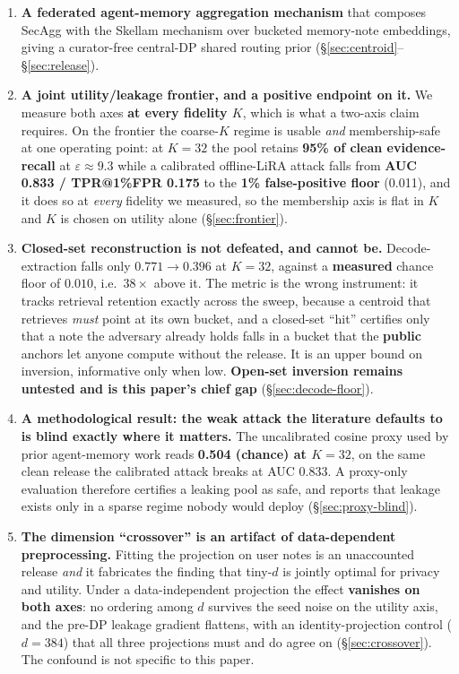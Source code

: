 \documentclass[pdflatex,sn-mathphys-num,12pt]{sn-jnl}
\theoremstyle{thmstyleone}%
\theoremstyle{thmstyletwo}%
\theoremstyle{thmstylethree}%
\newcommand{\eps}{\varepsilon}
\newcommand{\secref}[1]{\S\ref{#1}}
\begin{document}
\begin{enumerate}
  \item \textbf{A federated agent-memory aggregation mechanism} that composes
    SecAgg with the Skellam mechanism over bucketed memory-note embeddings,
    giving a curator-free central-DP shared routing prior
    (\secref{sec:centroid}--\secref{sec:release}).

  \item \textbf{A joint utility/leakage frontier, and a positive endpoint on it.}
    We measure both axes \textbf{at every fidelity $K$}, which is what a two-axis
    claim requires. On the frontier the coarse-$K$ regime is
    usable \emph{and} membership-safe at one operating point: at $K = 32$ the pool
    retains \textbf{95\% of clean evidence-recall} at $\eps \approx 9.3$ while a
    calibrated offline-LiRA attack falls from \textbf{AUC 0.833 / TPR@1\%FPR 0.175}
    to the \textbf{1\% false-positive floor} (0.011), and it does so at
    \emph{every} fidelity we measured, so the membership axis is flat in $K$ and
    $K$ is chosen on utility alone (\secref{sec:frontier}).

  \item \textbf{Closed-set reconstruction is not defeated, and cannot be.}
    Decode-extraction falls only $0.771 \to 0.396$ at $K = 32$, against a
    \textbf{measured} chance floor of $0.010$, i.e.\ $38\times$ above it. The metric is
    the wrong instrument: it tracks retrieval retention exactly across the sweep,
    because a centroid that retrieves \emph{must} point at its own bucket, and a
    closed-set ``hit'' certifies only that a note the adversary already holds falls in
    a bucket that the \textbf{public} anchors let anyone compute without the release.
    It is an upper bound on inversion, informative only when low. \textbf{Open-set
    inversion remains untested and is this paper's chief gap}
    (\secref{sec:decode-floor}).

  \item \textbf{A methodological result: the weak attack the literature defaults
    to is blind exactly where it matters.} The uncalibrated cosine proxy used by
    prior agent-memory work reads \textbf{0.504 (chance) at $K = 32$}, on the
    same clean release the calibrated attack breaks at AUC 0.833. A proxy-only
    evaluation therefore certifies a leaking pool as safe, and reports that leakage
    exists only in a sparse regime nobody would deploy (\secref{sec:proxy-blind}).

  \item \textbf{The dimension ``crossover'' is an artifact of data-dependent
    preprocessing.} Fitting the projection on user notes is an unaccounted release
    \emph{and} it fabricates the finding that tiny-$d$ is jointly optimal for privacy
    and utility. Under a data-independent projection the effect \textbf{vanishes on
    both axes}: no ordering among $d$ survives the seed noise on the utility axis, and
    the pre-DP leakage gradient flattens, with an identity-projection control
    ($d = 384$) that all three projections must and do agree on
    (\secref{sec:crossover}). The confound is not specific to this paper.


\end{enumerate}
\end{document}
